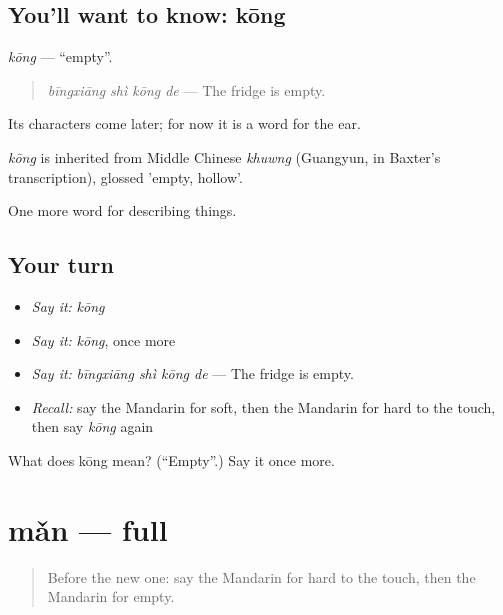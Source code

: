 \subsection*{You'll want to know: kōng}
\emph{kōng} — \textquotedblleft{}empty\textquotedblright{}.

\begin{quote}
\emph{bīngxiāng shì kōng de} — The fridge is empty.
\end{quote}

Its characters come later; for now it is a word for the ear.

\begin{cousinweb}
\emph{kōng} is inherited from Middle Chinese \emph{khuwng} (Guangyun, in Baxter's transcription), glossed 'empty, hollow'.
\end{cousinweb}

\begin{grammarlens}[title={What you've built}]
One more word for describing things.
\end{grammarlens}

\subsection*{Your turn}
\begin{itemize}
\raggedright
  \item \emph{Say it:} \emph{kōng}
  \item \emph{Say it:} \emph{kōng}, once more
  \item \emph{Say it:} \emph{bīngxiāng shì kōng de} — The fridge is empty.
  \item \emph{Recall:} say the Mandarin for soft, then the Mandarin for hard to the touch, then say \emph{kōng} again
\end{itemize}

\begin{tcolorbox}[breakable,colback=teal!4,colframe=teal!35!black,title={Before you move on}]
What does kōng mean? (\textquotedblleft{}Empty\textquotedblright{}.) Say it once more.
\end{tcolorbox}
\section[mǎn]{mǎn — full}

\label{lesson:ZH-C134-man}



\begin{quote}
Before the new one: say the Mandarin for hard to the touch, then the Mandarin for empty.
\end{quote}

